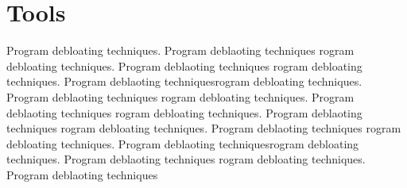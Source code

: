 \documentclass{relatorio}
\begin{document}
\section{Tools}%
\label{Tools}

Program debloating techniques. Program deblaoting techniques rogram debloating techniques. Program deblaoting techniques
rogram debloating techniques. Program deblaoting techniquesrogram debloating techniques. Program deblaoting techniques
rogram debloating techniques. Program deblaoting techniques rogram debloating techniques. Program deblaoting techniques
rogram debloating techniques. Program deblaoting techniques 
rogram debloating techniques. Program deblaoting techniquesrogram debloating techniques. Program deblaoting techniques
rogram debloating techniques. Program deblaoting techniques
\end{document}
